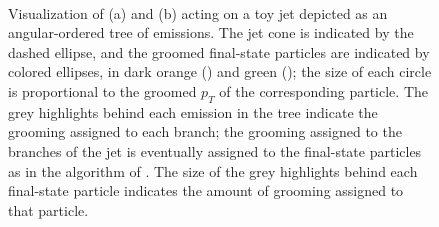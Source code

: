 \documentclass[letterpaper,11pt]{article}
\begin{document}
\begin{figure}[t!]
      \centering
      \centerline{
      ~~~~
      } %
\caption{
    Visualization of (a)  and (b)  acting on a toy jet depicted as an angular-ordered tree of emissions.
    The jet cone is indicated by the dashed ellipse, and the groomed final-state particles are indicated by colored ellipses, in dark orange () and green ();
    the size of each circle is proportional to the groomed \(p_T\) of the corresponding particle.
    The grey highlights behind each emission in the tree indicate the grooming assigned to each branch;
    the grooming assigned to the branches of the jet is eventually assigned to the final-state particles as in the algorithm of .
    The size of the grey highlights behind each final-state particle indicates the amount of grooming assigned to that particle.
}
\label{fig:rsf_tree}
\end{figure}



\end{document}
